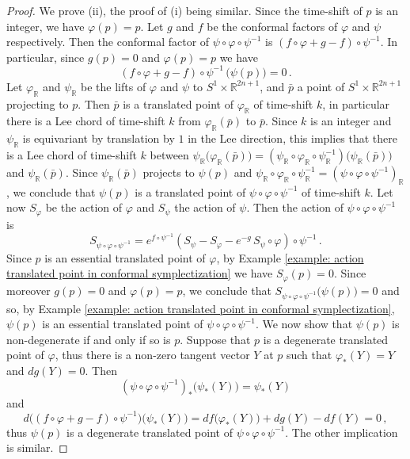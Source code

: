 \documentclass{amsart}
\theoremstyle{remark}
\begin{document}
\begin{proof}
We prove (ii),
the proof of (i) being similar.
Since the time-shift of $p$ is an integer,
we have $\varphi (p) = p$.
Let $g$ and $f$ be the conformal factors
of $\varphi$ and $\psi$ respectively.
Then the conformal factor of $\psi \circ \varphi \circ \psi^{-1}$ is
$(f \circ \varphi + g - f) \circ \psi^{-1}$.
In particular,
since $g(p) = 0$ and $\varphi (p) = p$
we have
\[
(f \circ \varphi + g - f ) \circ \psi^{-1}
\, \big(\psi(p)\big) = 0 \,.
\]
Let $\varphi_{\mathbb{R}}$ and $\psi_{\mathbb{R}}$
be the lifts of $\varphi$ and $\psi$ to $S^1 \times \mathbb{R}^{2n+1}$,
and $\bar{p}$ a point of $S^1 \times \mathbb{R}^{2n+1}$
projecting to $p$.
Then $\bar{p}$ is a translated point of $\varphi_{\mathbb{R}}$
of time-shift $k$,
in particular there is a Lee chord of time-shift $k$
from $\varphi_{\mathbb{R}} (\bar{p})$ to $\bar{p}$.
Since $k$ is an integer
and $\psi_{\mathbb{R}}$ is equivariant by translation by $1$
in the Lee direction,
this implies that there is a Lee chord
of time-shift $k$
between $\psi_{\mathbb{R}} \big(\varphi_{\mathbb{R}}(\bar{p})\big)
= (\psi_{\mathbb{R}} \circ \varphi_{\mathbb{R}} \circ \psi_{\mathbb{R}}^{-1})
\big(\psi_{\mathbb{R}}(\bar{p})\big)$
and $\psi_{\mathbb{R}}(\bar{p})$.
Since $\psi_{\mathbb{R}}(\bar{p})$ projects to $\psi(p)$
and $\psi_{\mathbb{R}} \circ \varphi_{\mathbb{R}} \circ \psi_{\mathbb{R}}^{-1}
= ( \psi \circ \varphi \circ \psi^{-1} )_{\mathbb{R}}$,
we conclude that $\psi(p)$ is a translated point
of $\psi \circ \varphi \circ \psi^{-1}$
of time-shift $k$.
Let now $S_{\varphi}$ be the action of $\varphi$
and $S_{\psi}$ the action of $\psi$.
Then the action of $\psi \circ \varphi \circ \psi^{-1}$ is
\[
S_{\psi \circ \varphi \circ \psi^{-1}} =
e^{f \circ \psi^{-1}} (S_{\psi} - S_{\varphi} - e^{- g} \, S_{\psi} \circ \varphi) \circ \psi^{-1} \,.
\]
Since $p$ is an essential translated point of $\varphi$,
by Example \ref{example: action translated point in conformal symplectization}
we have $S_{\varphi} (p) = 0$.
Since moreover $g(p) = 0$ and $\varphi(p) = p$,
we conclude that $S_{\psi \circ \varphi \circ \psi^{-1}} \big(\psi(p)\big) = 0$
and so, by Example \ref{example: action translated point in conformal symplectization},
$\psi(p)$ is an essential translated point
of $\psi \circ \varphi \circ \psi^{-1}$.
We now show that $\psi(p)$ is non-degenerate
if and only if so is $p$.
Suppose that $p$ is a degenerate translated point of $\varphi$,
thus there is a non-zero tangent vector $Y$ at $p$
such that $\varphi_{\ast}(Y) = Y$ and $dg(Y) = 0$.
Then
\[
(\psi \circ \varphi \circ \psi^{-1})_{\ast} \big( \psi_{\ast}(Y) \big)
= \psi_{\ast} (Y)
\]
and
\[
d \big( ( f \circ \varphi + g  - f) \circ \psi^{-1} \big)
\big( \psi_{\ast}(Y) \big)
= df \big( \varphi_{\ast}(Y) \big) + dg(Y) - df (Y)
= 0 \,,
\]
thus $\psi(p)$ is a degenerate translated point
of $\psi \circ \varphi \circ \psi^{-1}$.
The other implication is similar.
\end{proof}
\end{document}
